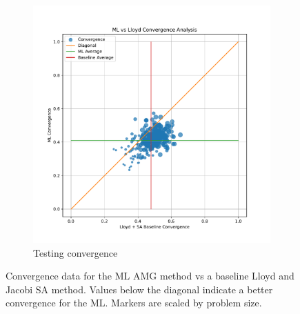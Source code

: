 \documentclass{article}
\begin{document}
\begin{figure}[h]
\begin{subfigure}[t]{0.49\textwidth}
    \includegraphics[width=\textwidth]{test_convergence.pdf}
    \caption{Testing convergence}
  \end{subfigure}
  \caption{Convergence data for the ML AMG method vs a baseline Lloyd and Jacobi SA method.  Values below the diagonal indicate a better convergence for the ML.  Markers are scaled by problem size.}
  \label{fig:conv}
\end{figure}

\end{document}
